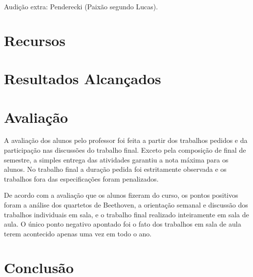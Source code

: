 \documentclass{article}
\begin{document}
Audição extra: Penderecki (Paixão segundo Lucas).

\section{Recursos}
\label{sec:recursos}

\section{Resultados Alcançados}
\label{sec:result-alcanc}

\section{Avaliação}
\label{sec:avaliacao}

A avaliação dos alunos pelo professor foi feita a partir dos trabalhos
pedidos e da participação nas discussões do trabalho final. Exceto
pela composição de final de semestre, a simples entrega das atividades
garantiu a nota máxima para os alunos. No trabalho final a duração
pedida foi estritamente observada e os trabalhos fora das
especificações foram penalizados.

De acordo com a avaliação que os alunos fizeram do curso, os pontos
positivos foram a análise dos quartetos de Beethoven, a orientação
semanal e discussão dos trabalhos individuais em sala, e o trabalho
final realizado inteiramente em sala de aula. O único ponto negativo
apontado foi o fato dos trabalhos em sala de aula terem acontecido
apenas uma vez em todo o ano.

\section{Conclusão}
\label{sec:conclusao}


\renewcommand{\refname}{Bibliografia}

\nocite{Beethoven1970,Heussenstamm1987,adler89:_study_orches,Kennan1997,stone80:_music_notat_twent_centur}



\end{document}
